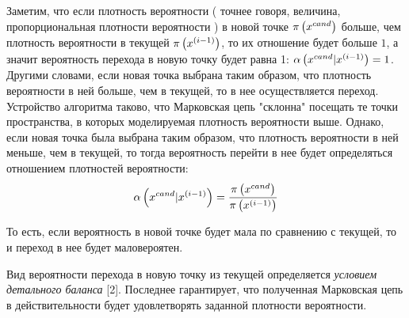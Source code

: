 Заметим, что если плотность вероятности ( точнее говоря, величина, пропорциональная плотности вероятности ) в новой точке $\pi \left( x^{cand} \right)$ больше, чем плотность вероятности в текущей $\pi \left( x^{\left( i - 1 \right)} \right)$, то их отношение будет больше $1$, а значит вероятность перехода в новую точку будет равна 1: $\alpha \left( x^{cand} | x^{(i - 1)} \right) = 1$. Другими словами, если новая точка выбрана таким образом, что плотность вероятности в ней больше, чем в текущей, то в нее осуществляется переход. Устройство алгоритма таково, что Марковская цепь "склонна" посещать те точки пространства, в которых моделируемая плотность вероятности выше. Однако, если новая точка была выбрана таким образом, что плотность вероятности в ней меньше, чем в текущей, то тогда вероятность перейти в нее будет определяться отношением плотностей вероятности:
\begin{gather}
		\alpha \left( x^{cand} | x^{(i - 1)} \right) = \frac{\pi \left( x^{cand} \right)}{\pi \left( x^{(i - 1)} \right)} \notag
\end{gather}

То есть, если вероятность в новой точке будет мала по сравнению с текущей, то и переход в нее будет маловероятен. \par
Вид вероятности перехода в новую точку из текущей определяется \textit{условием детального баланса} [2]. Последнее гарантирует, что полученная Марковская цепь в действительности будет удовлетворять заданной плотности вероятности.

